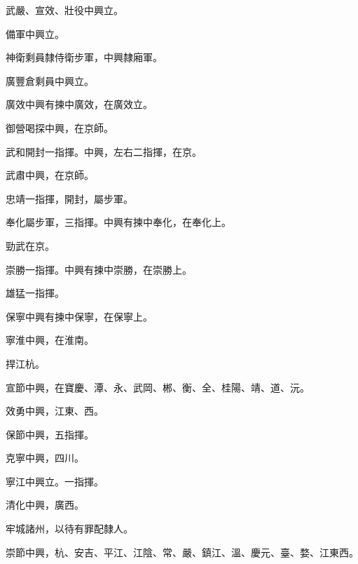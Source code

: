 \begin{pinyinscope}
 武嚴、宣效、壯役中興立。



 備軍中興立。



 神衛剩員隸侍衛步軍，中興隸廂軍。



 廣豐倉剩員中興立。



 廣效中興有揀中廣效，在廣效立。



 御營喝探中興，在京師。



 武和開封一指揮。中興，左右二指揮，在京。



 武肅中興，在京師。



 忠靖一指揮，開封，屬步軍。



 奉化屬步軍，三指揮。中興有揀中奉化，在奉化上。



 勁武在京。



 崇勝一指揮。中興有揀中崇勝，在崇勝上。



 雄猛一指揮。



 保寧中興有揀中保寧，在保寧上。



 寧淮中興，在淮南。



 捍江杭。



 宣節中興，在寶慶、潭、永、武岡、郴、衡、全、桂陽、靖、道、沅。



 效勇中興，江東、西。



 保節中興，五指揮。



 克寧中興，四川。



 寧江中興立。一指揮。



 清化中興，廣西。



 牢城諸州，以待有罪配隸人。



 崇節中興，杭、安吉、平江、江陰、常、嚴、鎮江、溫、慶元、臺、婺、江東西。




\end{pinyinscope}
